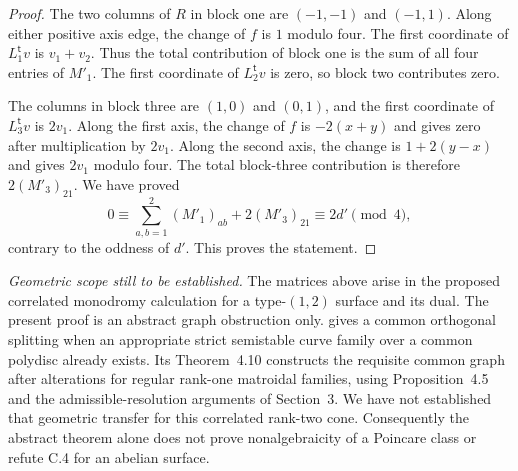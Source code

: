 \begin{proof}
The two columns of $R$ in block one are $(-1,-1)$ and
$(-1,1)$. Along either positive axis edge, the change of $f$
is $1$ modulo four. The first coordinate of
$L_1^{\mathsf t}v$ is $v_1+v_2$. Thus the total contribution
of block one is the sum of all four entries of $M'_1$.
The first coordinate of $L_2^{\mathsf t}v$ is zero, so block
two contributes zero.

The columns in block three are $(1,0)$ and $(0,1)$, and the
first coordinate of $L_3^{\mathsf t}v$ is $2v_1$. Along the
first axis, the change of $f$ is $-2(x+y)$ and gives zero
after multiplication by $2v_1$. Along the second axis, the
change is $1+2(y-x)$ and gives $2v_1$ modulo four. The total
block-three contribution is therefore $2(M'_3)_{21}$.
We have proved
\[
          0\equiv\sum_{a,b=1}^2(M'_1)_{ab}
                         +2(M'_3)_{21}
             \equiv2d'\pmod4,
\]
contrary to the oddness of $d'$. This proves the statement.
\end{proof}

\emph{Geometric scope still to be established.}
The matrices above arise in the proposed correlated monodromy
calculation for a type-$(1,2)$ surface and its dual. The present
proof is an abstract graph obstruction only.
\citet[Lemma~2.13]{cyEngelFortmanSchreieder2026} gives a common
orthogonal splitting when an appropriate strict semistable curve
family over a common polydisc already exists. Its Theorem~4.10
constructs the requisite common graph after alterations for
regular rank-one matroidal families, using Proposition~4.5 and
the admissible-resolution arguments of Section~3. We have not
established that geometric transfer for this correlated rank-two
cone. Consequently the abstract theorem alone does not prove
nonalgebraicity of a Poincare class or refute C.4 for an abelian
surface.

